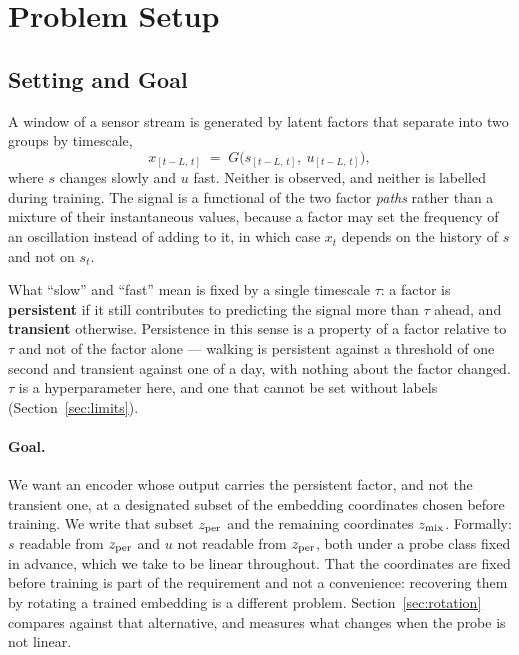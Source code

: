 \section{Problem Setup}

\subsection{Setting and Goal}
\label{sec:problem}

A window of a sensor stream is generated by latent factors that separate into two groups by timescale,
\begin{equation}
x_{[t-L,\,t]} \;=\; G\big(s_{[t-L,\,t]},\ u_{[t-L,\,t]}\big),
\label{eq:setting}
\end{equation}
where $s$ changes slowly and $u$ fast. Neither is observed, and neither is labelled during training. The signal is a functional of the two factor \emph{paths} rather than a mixture of their instantaneous values, because a factor may set the frequency of an oscillation instead of adding to it, in which case $x_t$ depends on the history of $s$ and not on $s_t$.

What ``slow'' and ``fast'' mean is fixed by a single timescale $\tau$: a factor is \textbf{persistent} if it still contributes to predicting the signal more than $\tau$ ahead, and \textbf{transient} otherwise. Persistence in this sense is a property of a factor relative to $\tau$ and not of the factor alone --- walking is persistent against a threshold of one second and transient against one of a day, with nothing about the factor changed. $\tau$ is a hyperparameter here, and one that cannot be set without labels (Section~\ref{sec:limits}).

\paragraph{Goal.} We want an encoder whose output carries the persistent factor, and not the transient one, at a designated subset of the embedding coordinates chosen before training. We write that subset $z_{\mathrm{per}}$ and the remaining coordinates $z_{\mathrm{mix}}$. Formally: $s$ readable from $z_{\mathrm{per}}$ and $u$ not readable from $z_{\mathrm{per}}$, both under a probe class fixed in advance, which we take to be linear throughout. That the coordinates are fixed before training is part of the requirement and not a convenience: recovering them by rotating a trained embedding is a different problem. Section~\ref{sec:rotation} compares against that alternative, and measures what changes when the probe is not linear.

